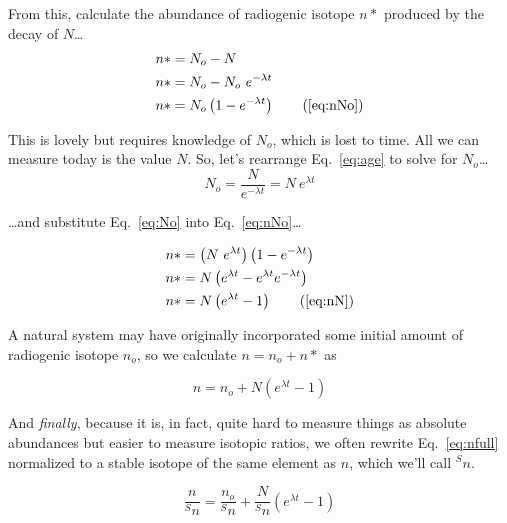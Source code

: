 \documentclass[12pt, letterpaper,twocolumn]{article}
\begin{document}
From this, calculate the abundance of radiogenic isotope $n*$ produced by the decay of $N$\dots
\begin{subequations}\label{eq:nNo}
\begin{align*}
    n* &= N_o - N 
\\
    n* &= N_o - N_o~e^{-\lambda t}
\\
    n* &= N_o \left( 1 - e^{-\lambda t} \right) \tag{\ref{eq:nNo}}
\end{align*}
\end{subequations}

This is lovely but requires knowledge of $N_o$, which is lost to time. 
All we can measure today is the value $N$.
So, let's rearrange Eq.~\ref{eq:age} to solve for $N_o$\dots
\begin{equation} \label{eq:No}
    N_o = \frac{N}{e^{-\lambda t}} = N~e^{\lambda t}
\end{equation}

\dots and substitute Eq.~\ref{eq:No} into Eq.~\ref{eq:nNo}\dots

\begin{subequations}\label{eq:nN}
\begin{align*}
     n* &= \left(N~e^{\lambda t}\right) \left( 1 - e^{-\lambda t}\right) 
     \\
     n* &= N \left( e^{\lambda t} - e^{\lambda t} e^{-\lambda t}\right) 
     \\
     n* &= N \left( e^{\lambda t} - 1 \right) \tag{\ref{eq:nN}}
\end{align*}
\end{subequations}

A natural system may have originally incorporated some initial amount of radiogenic isotope $n_o$, so  we calculate $n = n_o + {n*}$ as

\begin{equation}\label{eq:nfull}
    n = n_o + N \left( e^{\lambda t} - 1 \right)
\end{equation}

And \emph{finally}, because it is, in fact, quite hard to measure things as absolute abundances but easier to measure isotopic ratios, we often rewrite Eq.~\ref{eq:nfull} normalized to a stable isotope of the same element as $n$, which we'll call $^S n$.

\begin{equation}\label{eq:ratios}
    \frac{n}{^S n} = \frac{n_o}{^S n} + \frac{N}{^S n} \left( e^{\lambda t} - 1 \right)
\end{equation}
\end{document}
